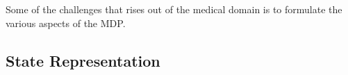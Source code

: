 %


Some of the challenges that rises out of the medical domain is to formulate the various aspects of the MDP. 
\subsection{State Representation}


